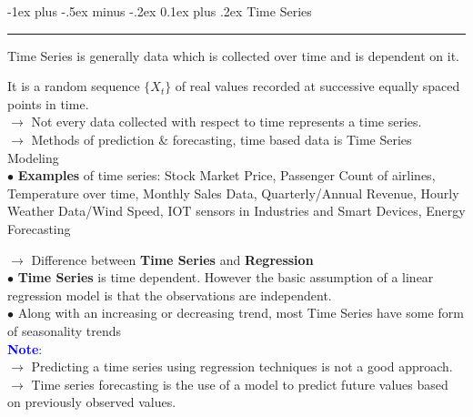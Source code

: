 \documentclass[letterpaper, 10.5pt,landscape]{article}
\makeatletter
\renewcommand{\section}{\@startsection{section}{1}{0mm}%
                                {-1ex plus -.5ex minus -.2ex}%
                                {0.1ex plus .2ex}%
                                {\normalfont\small}}
\makeatother
\begin{document}
\begin{multicols*}{3}









\section{Time Series} {\color{teal}\hrule height 1pt} \smallskip
Time Series is generally data which is collected over time and is dependent on it.

\vspace{2pt}

It is a random sequence $\{X_{t} \}$ of real values recorded at successive equally spaced points in time. \\

$\rightarrow$ Not every data collected with respect to time represents a time series. \\
$\rightarrow$ Methods of prediction \& forecasting, time based data is Time Series Modeling \\

\vspace{2pt}
$\bullet$ \textbf{Examples} of time series: Stock Market Price, Passenger Count of airlines, Temperature over time, Monthly Sales Data, Quarterly/Annual Revenue, Hourly Weather Data/Wind Speed, IOT sensors in Industries and Smart Devices, Energy Forecasting

\vspace{3pt}
$\rightarrow$ Difference between \textbf{Time Series} and \textbf{Regression} \\
$\bullet$ \textbf{Time Series} is time dependent. However the basic assumption of a linear regression model is that the observations are independent. \\
$\bullet$ Along with an increasing or decreasing trend, most Time Series have some form of seasonality trends\\

\vspace{3pt}
\textcolor{blue}{\textbf{Note}:}\\
$\rightarrow$ Predicting a time series using regression techniques is not a good approach. \\
$\rightarrow$ Time series forecasting is the use of a model to predict future values based on previously observed values.



\end{multicols*}
\end{document}
